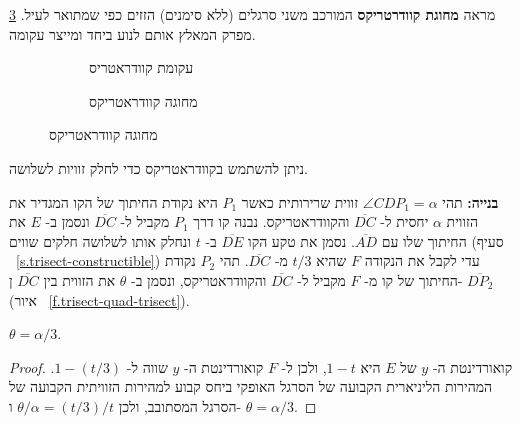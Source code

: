 \ref{f.trisect-quad-compass}
מראה
\textbf{מחוגת קוודרטריקס}
המורכב משני סרגלים (ללא סימנים) הזזים כפי שמתואר לעיל. מפרק המאלץ אותם לנוע ביחד ומייצר עקומה.

\begin{figure}[tb]
\begin{center}
\begin{subfigure}{.45\textwidth}
\caption{עקומת קוודראטריס}\label{f.trisect-quad-curve}
\end{subfigure}
\hspace{2em}
\begin{subfigure}{.45\textwidth}
\caption{מחוגה קוודראטריקס}\label{f.trisect-quad-compass}
\end{subfigure}
\end{center}
\end{figure}

ניתן להשתמש בקוודראטריקס כדי לחלק זוויות לשלושה.

\textbf{בנייה:}
תהי
$\angle CDP_1=\alpha$
זווית שרירותית כאשר 
$P_1$
היא נקודת החיתוך של הקו המגדיר את הזווית
$\alpha$
יחסית ל-%
$\overline{DC}$
והקוודראטריקס. נבנה קו דרך 
$P_1$
מקביל ל-%
$\overline{DC}$
ונסמן ב-%
$E$
את החיתוך שלו עם
$\overline{AD}$.
נסמן את טקע הקו 
$\overline{DE}$
ב-%
$t$
ונחלק אותו לשלושה חלקים שווים (סעיף%
~\ref{s.trisect-constructible})
עדי לקבל את הנקודה
$F$
שהיא
$t/3$
מ-%
$\overline{DC}$.
תהי
$P_2$
נקודת החיתוך של קו מ-%
$F$
מקביל ל-%
$\overline{DC}$
והקוודראטריקס, ונסמן ב-%
$\theta$
את הזווית בין
$\overline{DC}$
ן-%
$\overline{DP_2}$
(איור%
~\ref{f.trisect-quad-trisect}).
\begin{theorem}
$\theta=\alpha/3$.
\end{theorem}
\begin{proof}
קואורדינטת ה-%
$y$
של
$E$
היא
$1-t$,
ולכן ל-%
$F$
קואורדינטת ה-%
$y$
שווה ל-%
$1-(t/3)$.
המהירות הליניארית הקבועה של הסרגל האופקי ביחס קבוע למהירות הזוויתית הקבועה של הסרגל המסתובב, ולכן
$\theta/\alpha = (t/3)/t$
ו-%
$\theta = \alpha/3$.
\end{proof}

